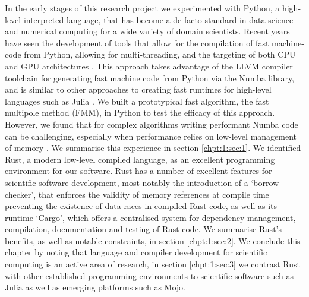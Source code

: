 In the early stages of this research project we experimented with Python, a high-level interpreted language, that has become a de-facto standard in data-science and numerical computing for a wide variety of domain scientists. Recent years have seen the development of tools that allow for the compilation of fast machine-code from Python, allowing for multi-threading, and the targeting of both CPU and GPU architectures \cite{lam2015numba}. This approach takes advantage of the LLVM compiler toolchain for generating fast machine code from Python via the Numba library, and is similar to other approaches to creating fast runtimes for high-level languages such as Julia \cite{bezanson2017julia}. We built a prototypical fast algorithm, the fast multipole method (FMM), in Python to test the efficacy of this approach. However, we found that for complex algorithms writing performant Numba code can be challenging, especially when performance relies on low-level management of memory \cite{kailasa2022pyexafmm}. We summarise this experience in section \ref{chpt:1:sec:1}. We identified Rust, a modern low-level compiled language, as an excellent programming environment for our software. Rust has a number of excellent features for scientific software development, most notably the introduction of a `borrow checker', that enforces the validity of memory references at compile time preventing the existence of data races in compiled Rust code, as well as its runtime `Cargo', which offers a centralised system for dependency management, compilation, documentation and testing of Rust code. We summarise Rust's benefits, as well as notable constraints, in section \ref{chpt:1:sec:2}. We conclude this chapter by noting that language and compiler development for scientific computing is an active area of research, in section \ref{chpt:1:sec:3} we contrast Rust with other established programming environments to scientific software such as Julia as well as emerging platforms such as Mojo.
